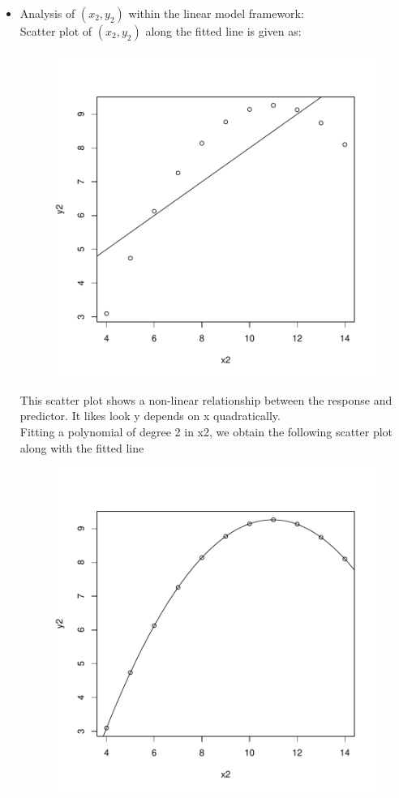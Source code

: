 \documentclass[12pt]{article}
\begin{document}
\begin{itemize}
\item Analysis of $(x_2, y_2)$ within the linear model framework:\\
Scatter plot of $(x_2, y_2)$ along the fitted line is given as:
\begin{figure}[H]
\includegraphics{HW6-010}
\end{figure}
This scatter plot shows a non-linear relationship between the response and predictor. It likes look y depends on x quadratically.\\

Fitting a polynomial of degree 2 in x2, we obtain the following scatter plot along with the fitted line
\begin{figure}[H]
\includegraphics{HW6-011}
\end{figure}


\end{itemize}
\end{document}
